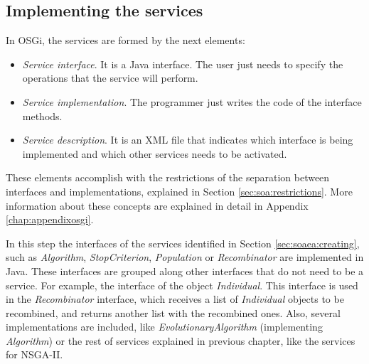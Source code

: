 
 
\subsection{Implementing the services}
\label{sec:osgiliath:implementing}

In OSGi, the services are formed by the next elements:

\begin{itemize}
\item {\em Service interface}. It is a Java interface. The user just needs to specify the operations that the service will perform.
\item {\em Service implementation}. The programmer just writes the code of the interface methods.
\item {\em Service description}. It is an XML file that indicates which
  interface is being implemented and which other services needs to be
  activated. 
\end{itemize}
These elements accomplish with the restrictions of the separation between interfaces and implementations, explained in Section \ref{sec:soa:restrictions}. More information about these concepts are explained in detail in Appendix \ref{chap:appendixosgi}. %

In this step the interfaces of the services identified in
Section \ref{sec:soaea:creating}, such as {\em Algorithm}, {\em
  StopCriterion}, {\em Population} or {\em Recombinator} are implemented in Java. These
interfaces are grouped along other interfaces that do not need to be a
service. For example, the interface of the object {\em
  Individual}. This interface is used in the {\em Recombinator}
interface, which receives a list of {\em Individual} objects to be
recombined, and returns another list with the recombined ones. 
Also, several implementations are included, like {\em
  EvolutionaryAlgorithm} (implementing {\em  Algorithm}) or the rest
of  services explained in previous chapter, like the services for
NSGA-II. %

